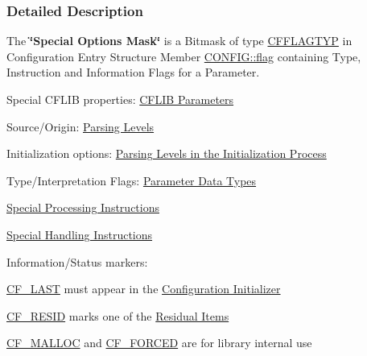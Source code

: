 \subsubsection{Detailed Description}
The {\bfseries \char`\"{}\-Special Options Mask\char`\"{}} is a Bitmask of type \hyperlink{group__special__options__mask_ga4854f1596d5c6e0604a478fa9a2e23f0}{C\-F\-F\-L\-A\-G\-T\-Y\-P} in Configuration Entry Structure Member \hyperlink{struct_c_o_n_f_i_g_ab04d08abdf758c0400caaded716f4089}{C\-O\-N\-F\-I\-G\-::flag} containing Type, Instruction and Information Flags for a Parameter. 
\begin{DoxyItemize}
\item Special C\-F\-L\-I\-B properties\-: \hyperlink{parameter_types_cflib_parameters}{C\-F\-L\-I\-B Parameters}
\item Source/\-Origin\-: \hyperlink{config_levels_parsing_levels}{Parsing Levels}
\item Initialization options\-: \hyperlink{config_levels_initialization_process}{Parsing Levels in the Initialization Process}
\item Type/\-Interpretation Flags\-: \hyperlink{parameter_types_parameter_datatypes}{Parameter Data Types}
\item \hyperlink{parameter_types_processing_instructions}{Special Processing Instructions}
\item \hyperlink{parameter_types_handling_instructions}{Special Handling Instructions}
\item Information/\-Status markers\-: \begin{DoxyItemize}
\item \hyperlink{group__special__options__mask_gaa4d82cea91ede4aee78594417894e368}{C\-F\-\_\-\-L\-A\-S\-T} must appear in the \hyperlink{config_initializer}{Configuration Initializer} \item \hyperlink{group__special__options__mask_ga5415b257c706aae33d91d3947a3429c0}{C\-F\-\_\-\-R\-E\-S\-I\-D} marks one of the \hyperlink{config_levels_residuals}{Residual Items} \item \hyperlink{group__special__options__mask_ga2b971231bd3cbad743ef2f4e0a613a47}{C\-F\-\_\-\-M\-A\-L\-L\-O\-C} and \hyperlink{group__special__options__mask_ga618e7187ee15bacfe668e72a858e71fc}{C\-F\-\_\-\-F\-O\-R\-C\-E\-D} are for library internal use \end{DoxyItemize}

\end{DoxyItemize}
